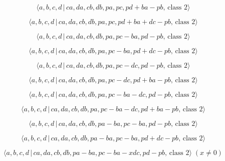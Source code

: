 \documentclass[10pt]{article}
\begin{document}
\begin{equation}
\langle a,b,c,d\,|\,ca,da,cb,db,pa,pc,pd+ba-pb,\,\text{class }2\rangle 
\tag{7.3014}
\end{equation}

\begin{equation}
\langle a,b,c,d\,|\,ca,da,cb,db,pa,pc,pd+ba+dc-pb,\,\text{class }2\rangle 
\tag{7.3015}
\end{equation}

\begin{equation}
\langle a,b,c,d\,|\,ca,da,cb,db,pa,pc-ba,pd-pb,\,\text{class }2\rangle 
\tag{7.3016}
\end{equation}

\begin{equation}
\langle a,b,c,d\,|\,ca,da,cb,db,pa,pc-ba,pd+dc-pb,\,\text{class }2\rangle 
\tag{7.3017}
\end{equation}

\begin{equation}
\langle a,b,c,d\,|\,ca,da,cb,db,pa,pc-dc,pd-pb,\,\text{class }2\rangle 
\tag{7.3018}
\end{equation}

\begin{equation}
\langle a,b,c,d\,|\,ca,da,cb,db,pa,pc-dc,pd+ba-pb,\,\text{class }2\rangle 
\tag{7.3019}
\end{equation}

\begin{equation}
\langle a,b,c,d\,|\,ca,da,cb,db,pa,pc-ba-dc,pd-pb,\,\text{class }2\rangle 
\tag{7.3020}
\end{equation}

\begin{equation}
\langle a,b,c,d\,|\,ca,da,cb,db,pa,pc-ba-dc,pd+ba-pb,\,\text{class }2\rangle
\tag{7.3021}
\end{equation}

\begin{equation}
\langle a,b,c,d\,|\,ca,da,cb,db,pa-ba,pc-ba,pd-pb,\,\text{class }2\rangle 
\tag{7.3022}
\end{equation}

\begin{equation}
\langle a,b,c,d\,|\,ca,da,cb,db,pa-ba,pc-ba,pd+dc-pb,\,\text{class }2\rangle
\tag{7.3023}
\end{equation}

\begin{equation}
\langle a,b,c,d\,|\,ca,da,cb,db,pa-ba,pc-ba-xdc,pd-pb,\,\text{class }%
2\rangle \;(x \neq 0)  \tag{7.3024}
\end{equation}
\end{document}
